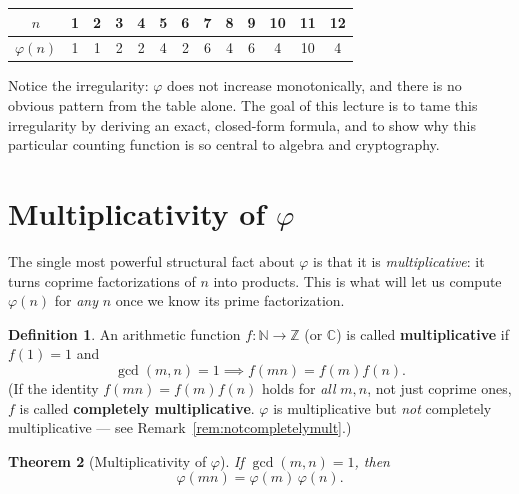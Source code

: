 \documentclass[11pt]{article}
\newtheorem{theorem}{Theorem}[section]
\theoremstyle{definition}
\newtheorem{definition}[theorem]{Definition}
\theoremstyle{remark}
\newcommand{\Z}{\mathbb{Z}}
\newcommand{\N}{\mathbb{N}}
\begin{document}
\begin{center}
\begin{tabular}{c|cccccccccccc}
\toprule
$n$ & 1 & 2 & 3 & 4 & 5 & 6 & 7 & 8 & 9 & 10 & 11 & 12\\
\midrule
$\varphi(n)$ & 1 & 1 & 2 & 2 & 4 & 2 & 6 & 4 & 6 & 4 & 10 & 4\\
\bottomrule
\end{tabular}
\end{center}

Notice the irregularity: $\varphi$ does not increase monotonically, and there is no obvious pattern from the table alone. The goal of this lecture is to tame this irregularity by deriving an exact, closed-form formula, and to show why this particular counting function is so central to algebra and cryptography.

\section{Multiplicativity of $\varphi$}

The single most powerful structural fact about $\varphi$ is that it is \emph{multiplicative}: it turns coprime factorizations of $n$ into products. This is what will let us compute $\varphi(n)$ for \emph{any} $n$ once we know its prime factorization.

\begin{definition}
An arithmetic function $f : \N \to \Z$ (or $\mathbb{C}$) is called \textbf{multiplicative} if $f(1) = 1$ and
\[
\gcd(m,n) = 1 \implies f(mn) = f(m)f(n).
\]
(If the identity $f(mn)=f(m)f(n)$ holds for \emph{all} $m,n$, not just coprime ones, $f$ is called \textbf{completely multiplicative}. $\varphi$ is multiplicative but \emph{not} completely multiplicative — see Remark~\ref{rem:notcompletelymult}.)
\end{definition}

\begin{theorem}[Multiplicativity of $\varphi$]\label{thm:mult}
If $\gcd(m,n) = 1$, then
\[
\varphi(mn) = \varphi(m)\,\varphi(n).
\]
\end{theorem}
\end{document}
